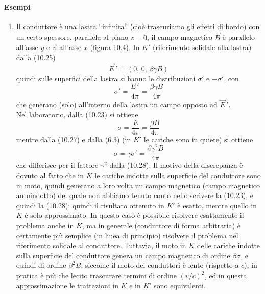 \paragraph{Esempi}
\begin{enumerate}
  \item Il conduttore \`e una lastra ``infinita'' (cio\`e trascuriamo gli
    effetti di bordo) con un certo spessore, parallela al piano $z=0$, il campo
    magnetico $\vec B$ \`e parallelo all'asse $y$ e $\vec v$ all'asse $x$
    (figura 10.4).
    In $K'$ (riferimento solidale alla lastra) dalla (10.25)
    \begin{equation}
      \vec E\,'=(0,\,0,\,\beta\gamma B)
      \tag{10.26}
    \end{equation}
    quindi sulle superfici della lastra si hanno le distribuzioni $\sigma'$ e
    $-\sigma'$, con
    \begin{equation}
      \sigma'=\frac{E\,'}{4\pi}=\frac{\beta\gamma B}{4\pi}
      \tag{10.27}
    \end{equation}
    che generano (solo) all'interno della lastra un campo opposto ad
    $\vec E\,'$.\\
    Nel laboratorio, dalla (10.23) si ottiene
    \begin{equation}
      \sigma=\frac{E}{4\pi}=\frac{\beta B}{4\pi}
      \tag{10.28}
    \end{equation}
    mentre dalla (10.27) e dalla (6.3) (in $K'$ le cariche sono in quiete) si
    ottiene
    \begin{equation}
      \sigma=\gamma\sigma'=\frac{\beta\gamma^2B}{4\pi}
      \tag{10.29}
    \end{equation}
    che differisce per il fattore $\gamma^2$ dalla (10.28). Il motivo della
    discrepanza \`e dovuto al fatto che in $K$ le cariche indotte sulla
    superficie del conduttore sono in moto, quindi generano a loro volta un
    campo magnetico (campo magnetico autoindotto) del quale non abbiamo tenuto
    conto nello scrivere la (10.23), e quindi la (10.28); quindi il risultato
    ottenuto in $K'$ \`e esatto, mentre quello in $K$ \`e solo approssimato. In
    questo caso \`e possibile risolvere esattamente il problema anche in $K$, ma
    in generale (conduttore di forma arbitraria) \`e certamente pi\`u semplice
    (in linea di principio) risolvere il problema nel riferimento solidale al
    conduttore. Tuttavia, il moto in $K$ delle cariche indotte sulla superficie
    del conduttore genera un campo magnetico di ordine $\beta\sigma$, e quindi
    di ordine $\beta^2B$: siccome il moto dei conduttori \`e lento (rispetto a
    $c$), in pratica \`e pi\`u che lecito trascurare termini di ordine
    $(v/c)^2$, ed in questa approssimazione le trattazioni in $K$ e in $K'$ sono
    equivalenti.


\end{enumerate}
